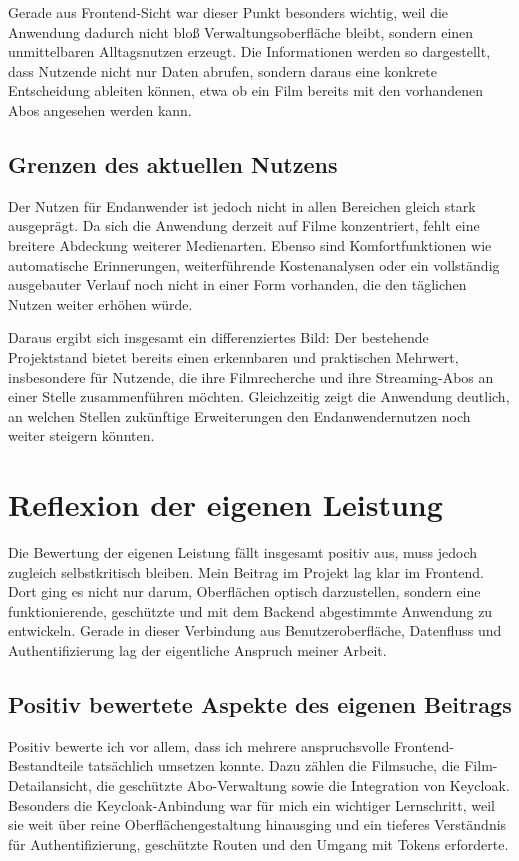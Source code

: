 Gerade aus Frontend-Sicht war dieser Punkt besonders wichtig, weil die Anwendung dadurch nicht bloß Verwaltungsoberfläche bleibt, sondern einen unmittelbaren Alltagsnutzen erzeugt. Die Informationen werden so dargestellt, dass Nutzende nicht nur Daten abrufen, sondern daraus eine konkrete Entscheidung ableiten können, etwa ob ein Film bereits mit den vorhandenen Abos angesehen werden kann.

\subsection{Grenzen des aktuellen Nutzens}
Der Nutzen für Endanwender ist jedoch nicht in allen Bereichen gleich stark ausgeprägt. Da sich die Anwendung derzeit auf Filme konzentriert, fehlt eine breitere Abdeckung weiterer Medienarten. Ebenso sind Komfortfunktionen wie automatische Erinnerungen, weiterführende Kostenanalysen oder ein vollständig ausgebauter Verlauf noch nicht in einer Form vorhanden, die den täglichen Nutzen weiter erhöhen würde.

Daraus ergibt sich insgesamt ein differenziertes Bild: Der bestehende Projektstand bietet bereits einen erkennbaren und praktischen Mehrwert, insbesondere für Nutzende, die ihre Filmrecherche und ihre Streaming-Abos an einer Stelle zusammenführen möchten. Gleichzeitig zeigt die Anwendung deutlich, an welchen Stellen zukünftige Erweiterungen den Endanwendernutzen noch weiter steigern könnten.

\section{Reflexion der eigenen Leistung}
Die Bewertung der eigenen Leistung fällt insgesamt positiv aus, muss jedoch zugleich selbstkritisch bleiben. Mein Beitrag im Projekt lag klar im Frontend. Dort ging es nicht nur darum, Oberflächen optisch darzustellen, sondern eine funktionierende, geschützte und mit dem Backend abgestimmte Anwendung zu entwickeln. Gerade in dieser Verbindung aus Benutzeroberfläche, Datenfluss und Authentifizierung lag der eigentliche Anspruch meiner Arbeit.

\subsection{Positiv bewertete Aspekte des eigenen Beitrags}
Positiv bewerte ich vor allem, dass ich mehrere anspruchsvolle Frontend-Bestandteile tatsächlich umsetzen konnte. Dazu zählen die Filmsuche, die Film-Detailansicht, die geschützte Abo-Verwaltung sowie die Integration von Keycloak. Besonders die Keycloak-Anbindung war für mich ein wichtiger Lernschritt, weil sie weit über reine Oberflächengestaltung hinausging und ein tieferes Verständnis für Authentifizierung, geschützte Routen und den Umgang mit Tokens erforderte.

